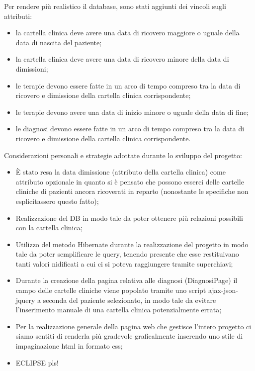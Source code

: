 \documentclass[a4paper,titlepage]{article}
\begin{document}
Per rendere più realistico il database, sono stati aggiunti dei vincoli sugli attributi:

\begin{itemize}[leftmargin=1.5cm, topsep=0.5cm, itemsep=0.2cm]

\item la cartella clinica deve avere una data di ricovero maggiore o uguale della data di nascita del paziente;

\item la cartella clinica deve avere una data di ricovero minore della data di dimissioni;

\item le terapie devono essere fatte in un arco di tempo compreso tra la data di ricovero e dimissione della cartella clinica corrispondente;

\item le terapie devono avere una data di inizio minore o uguale della data di fine;

\item le diagnosi devono essere fatte in un arco di tempo compreso tra la data di ricovero e dimissione della cartella clinica corrispondente.

\end{itemize}

Considerazioni personali e strategie adottate durante lo sviluppo del progetto:

\begin{itemize}[leftmargin=1.5cm, topsep=0.5cm, itemsep=0.2cm]

\item È stato resa la data dimissione (attributo della cartella clinica) come attributo opzionale in quanto si è pensato che possono esserci delle cartelle cliniche di pazienti ancora ricoverati in reparto (nonostante le specifiche non esplicitassero questo fatto);

\item Realizzazione del DB in modo tale da poter ottenere più relazioni possibili con la cartella clinica;
\item Utilizzo del metodo Hibernate durante la realizzazione del progetto in modo tale da poter semplificare le query, tenendo presente che esse restituivano tanti valori nidificati a cui ci si poteva raggiungere tramite superchiavi;
\item Durante la creazione della pagina relativa alle diagnosi (DiagnosiPage) il campo delle cartelle cliniche viene popolato tramite uno script ajax-json-jquery a seconda del paziente selezionato, in modo tale da evitare l'inserimento manuale di una cartella clinica potenzialmente errata;
\item Per la realizzazione generale della pagina web che gestisce l'intero progetto ci siamo sentiti di renderla più gradevole graficalmente inserendo uno stile di impaginazione html in formato css;
\item ECLIPSE pls!

\end{itemize}
\end{document}
